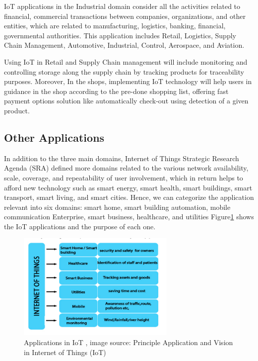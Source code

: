 \documentclass[conference]{IEEEtran}
\begin{document}
IoT applications in the Industrial domain consider all the activities related to financial, commercial transactions between companies, organizations, and other entities, which are related to manufacturing, logistics, banking, financial, governmental authorities. This application includes Retail, Logistics, Supply Chain Management, Automotive, Industrial,
Control, Aerospace, and Aviation. 

Using  IoT in Retail and Supply Chain management will include monitoring and controlling storage along the supply chain by tracking products for traceability purposes. Moreover,  In the shops, implementing IoT technology will help users in guidance in the shop according to the pre-done shopping list, offering fast payment options solution 
like automatically check-out using detection of a given product. 

\subsection{Other Applications}

In addition to the three main domains, Internet of Things Strategic Research Agenda (SRA) \cite{SRA} defined more domains related to the various network availability, scale, coverage, and repeatability of user involvement, which in return helps to afford new technology such as smart energy, smart health, smart buildings, smart transport, smart living, and smart cities. Hence, we can categorize the application relevant into six domains: smart home, smart building automation, mobile communication Enterprise, smart business, healthcare, and utilities Figure\ref{Applications} shows the IoT applications and the purpose of each one. 


\begin{figure}[h!]
	\centering
	\includegraphics[width=3in]{Applications.png}
	\caption{\label{Applications}  Applications in IoT  , image source: 
		Principle Application and Vision in Internet
		of Things (IoT)\cite{App} }
\end{figure}
\end{document}
